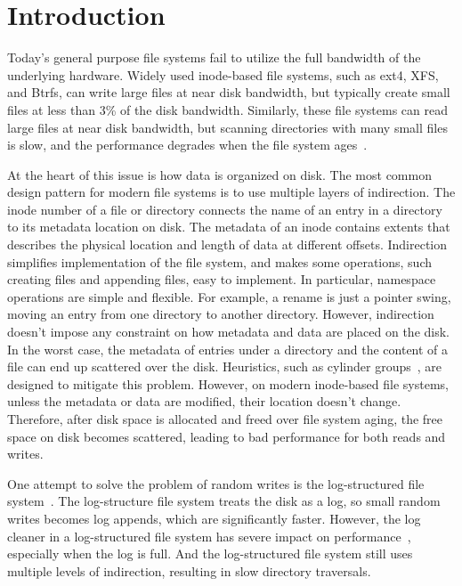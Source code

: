 \chapter{Introduction}
\label{chap:intro}

Today's general purpose file systems fail to utilize the full bandwidth of the
underlying hardware.
Widely used inode-based file systems, such as ext4, XFS, and Btrfs, can write
large files at near disk bandwidth,
but typically create small files at less than 3\% of the disk bandwidth.
Similarly, these file systems can read large files at near disk bandwidth,
but scanning directories with many small files is slow, and the performance
degrades when the file system ages~\citep{betrfs3}.

At the heart of this issue is how data is organized on disk.
The most common design pattern for modern file systems is to use multiple layers
of indirection.
The inode number of a file or directory connects the name of an entry in a
directory to its metadata location on disk.
The metadata of an inode contains extents that describes the physical location
and length of data at different offsets.
Indirection simplifies implementation of the file system, and makes some
operations, such creating files and appending files, easy to implement.
In particular, namespace operations are simple and flexible.
For example, a rename is just a pointer swing, moving an entry from one
directory to another directory.
However, indirection doesn't impose any constraint on how metadata and data
are placed on the disk.
In the worst case, the metadata of entries under a directory and the content of
a file can end up scattered over the disk.
Heuristics, such as cylinder groups~\citep{ffs1}, are designed to mitigate this
problem.
However, on modern inode-based file systems, unless the metadata or data are
modified, their location doesn't change.
Therefore, after disk space is allocated and freed over file system aging,
the free space on disk becomes scattered,
leading to bad performance for both reads and writes.

One attempt to solve the problem of random writes is the log-structured file
system~\citep{lfs}.
The log-structure file system treats the disk as a log, so small random writes
becomes log appends, which are significantly faster.
However, the log cleaner in a log-structured file system has severe impact on
performance~\citep{lfsbsd}, especially when the log is full.
And the log-structured file system still uses multiple levels of
indirection, resulting in slow directory traversals.

